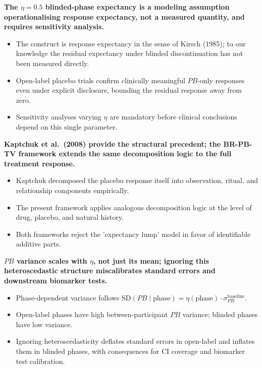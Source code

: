 \documentclass[
  11pt,
]{article}
\begin{document}
\textbf{The $\eta = 0.5$ blinded-phase expectancy is a modeling assumption operationalising response expectancy, not a measured quantity, and requires sensitivity analysis.}

\begin{itemize}\setlength{\itemsep}{2pt}\setlength{\parskip}{0pt}
\item The construct is response expectancy in the sense of Kirsch (1985); to our knowledge the residual expectancy under blinded discontinuation has not been measured directly.
\item Open-label placebo trials confirm clinically meaningful $PB$-only responses even under explicit disclosure, bounding the residual response away from zero.
\item Sensitivity analyses varying $\eta$ are mandatory before clinical conclusions depend on this single parameter.
\end{itemize}

\textbf{Kaptchuk et al.\ (2008) provide the structural precedent; the BR-PB-TV framework extends the same decomposition logic to the full treatment response.}

\begin{itemize}\setlength{\itemsep}{2pt}\setlength{\parskip}{0pt}
\item Kaptchuk decomposed the placebo response itself into observation, ritual, and relationship components empirically.
\item The present framework applies analogous decomposition logic at the level of drug, placebo, and natural history.
\item Both frameworks reject the 'expectancy lump' model in favor of identifiable additive parts.
\end{itemize}

\textbf{$PB$ variance scales with $\eta$, not just its mean; ignoring this heteroscedastic structure miscalibrates standard errors and downstream biomarker tests.}

\begin{itemize}\setlength{\itemsep}{2pt}\setlength{\parskip}{0pt}
\item Phase-dependent variance follows $\mathrm{SD}(PB \mid \text{phase}) = \eta(\text{phase}) \cdot \sigma_{PB}^{\text{baseline}}$.
\item Open-label phases have high between-participant $PB$ variance; blinded phases have low variance.
\item Ignoring heteroscedasticity deflates standard errors in open-label and inflates them in blinded phases, with consequences for CI coverage and biomarker test calibration.
\end{itemize}
\end{document}
